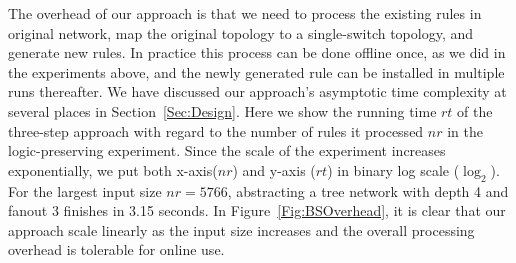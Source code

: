 The overhead of our approach is that we need to process the existing rules in original network,
map the original topology to a single-switch topology, and
generate new rules.
In practice this process can be done offline once, as we did in the experiments above,
and the newly generated rule can be installed in multiple runs thereafter.
We have discussed our approach's asymptotic time complexity at several places in Section~\ref{Sec:Design}.
Here we show the running time $rt$ of the three-step approach with regard to
the number of rules it processed $nr$ in the logic-preserving experiment.
Since the scale of the experiment increases exponentially, we put both x-axis($nr$)
and y-axis ($rt$) in binary log scale ($\log_2$).
For the largest input size $nr=5766$, abstracting a tree network with depth 4 and
fanout 3 finishes in 3.15 seconds.
In Figure~\ref{Fig:BSOverhead}, it is clear that our approach scale linearly as the
input size increases and the overall processing overhead is tolerable for online use.

